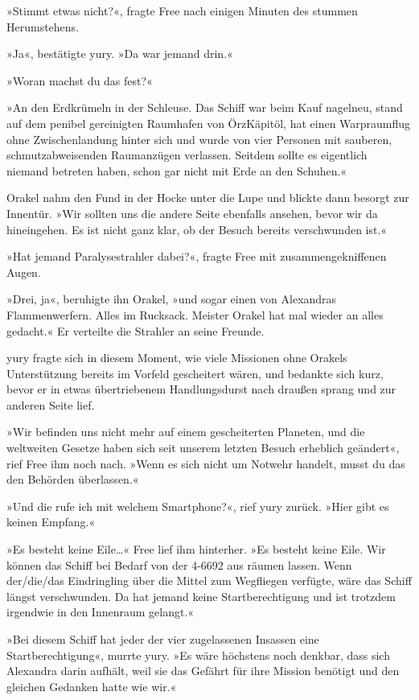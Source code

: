 »Stimmt etwas nicht?«, fragte Free nach einigen Minuten des stummen Herumstehens.

»Ja«, bestätigte yury. »Da war jemand drin.«

»Woran machst du das fest?«

»An den Erdkrümeln in der Schleuse. Das Schiff war beim Kauf nagelneu, stand auf dem penibel gereinigten Raumhafen von ÖrzKäpitöl, hat einen Warpraumflug ohne Zwischenlandung hinter sich und wurde von vier Personen mit sauberen, schmutzabweisenden Raumanzügen verlassen. Seitdem sollte es eigentlich niemand betreten haben, schon gar nicht mit Erde an den Schuhen.«

Orakel nahm den Fund in der Hocke unter die Lupe und blickte dann besorgt zur Innentür. »Wir sollten uns die andere Seite ebenfalls ansehen, bevor wir da hineingehen. Es ist nicht ganz klar, ob der Besuch bereits verschwunden ist.«

»Hat jemand Paralysestrahler dabei?«, fragte Free mit zusammengekniffenen Augen.

»Drei, ja«, beruhigte ihn Orakel, »und sogar einen von Alexandras Flammenwerfern. Alles im Rucksack. Meister Orakel hat mal wieder an alles gedacht.« Er verteilte die Strahler an seine Freunde.

yury fragte sich in diesem Moment, wie viele Missionen ohne Orakels Unterstützung bereits im Vorfeld gescheitert wären, und bedankte sich kurz, bevor er in etwas übertriebenem Handlungsdurst nach draußen sprang und zur anderen Seite lief.

»Wir befinden uns nicht mehr auf einem gescheiterten Planeten, und die weltweiten Gesetze haben sich seit unserem letzten Besuch erheblich geändert«, rief Free ihm noch nach. »Wenn es sich nicht um Notwehr handelt, musst du das den Behörden überlassen.«

»Und die rufe ich mit welchem Smartphone?«, rief yury zurück. »Hier gibt es keinen Empfang.«

»Es besteht keine Eile…« Free lief ihm hinterher. »Es besteht keine Eile. Wir können das Schiff bei Bedarf von der 4-6692 aus räumen lassen. Wenn der/die/das Eindringling über die Mittel zum Wegfliegen verfügte, wäre das Schiff längst verschwunden. Da hat jemand keine Startberechtigung und ist trotzdem irgendwie in den Innenraum gelangt.«

»Bei diesem Schiff hat jeder der vier zugelassenen Insassen eine Startberechtigung«, murrte yury. »Es wäre höchstens noch denkbar, dass sich Alexandra darin aufhält, weil sie das Gefährt für ihre Mission benötigt und den gleichen Gedanken hatte wie wir.«

